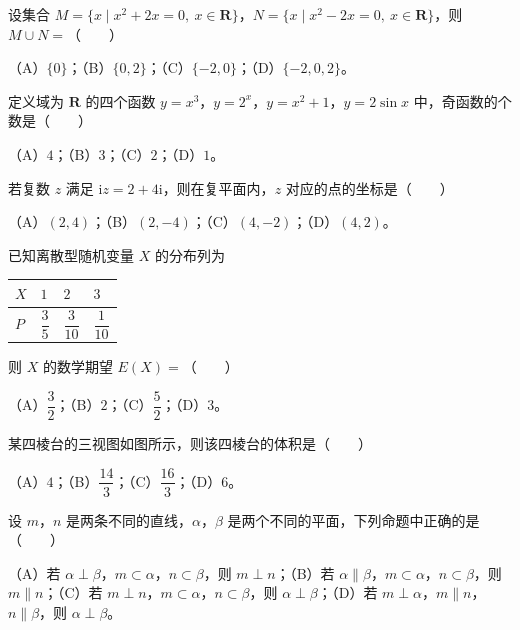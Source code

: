 \begin{question}
设集合 $M=\{x\mid x^2+2x=0,\ x\in\mathbf R\}$，$N=\{x\mid x^2-2x=0,\ x\in\mathbf R\}$，则 $M\cup N=$\mbox{（　　）}

（A）$\{0\}$；（B）$\{0,2\}$；（C）$\{-2,0\}$；（D）$\{-2,0,2\}$。

\end{question}
\begin{question}
定义域为 $\mathbf R$ 的四个函数 $y=x^3$，$y=2^x$，$y=x^2+1$，$y=2\sin x$ 中，奇函数的个数是\mbox{（　　）}

（A）$4$；（B）$3$；（C）$2$；（D）$1$。

\end{question}
\begin{question}
若复数 $z$ 满足 $\mathrm iz=2+4\mathrm i$，则在复平面内，$z$ 对应的点的坐标是\mbox{（　　）}

（A）$(2,4)$；（B）$(2,-4)$；（C）$(4,-2)$；（D）$(4,2)$。

\end{question}
\begin{question}
已知离散型随机变量 $X$ 的分布列为

\begin{center}
\begin{tabular}{llll}
\toprule
$X$ & $1$ & $2$ & $3$ \\
\midrule
$P$ & $\dfrac35$ & $\dfrac3{10}$ & $\dfrac1{10}$ \\
\bottomrule
\end{tabular}
\end{center}

则 $X$ 的数学期望 $E(X)=$\mbox{（　　）}

（A）$\dfrac32$；（B）$2$；（C）$\dfrac52$；（D）$3$。

\Needspace{0.4\textheight}
\end{question}
\begin{question}
某四棱台的三视图如图所示，则该四棱台的体积是\mbox{（　　）}
\nopagebreak[4]
\begin{center}\end{center}
\nopagebreak[4]
（A）$4$；（B）$\dfrac{14}{3}$；（C）$\dfrac{16}{3}$；（D）$6$。

\end{question}
\begin{question}
设 $m$，$n$ 是两条不同的直线，$\alpha$，$\beta$ 是两个不同的平面，下列命题中正确的是\mbox{（　　）}

（A）若 $\alpha\perp\beta$，$m\subset\alpha$，$n\subset\beta$，则 $m\perp n$；（B）若 $\alpha\parallel\beta$，$m\subset\alpha$，$n\subset\beta$，则 $m\parallel n$；（C）若 $m\perp n$，$m\subset\alpha$，$n\subset\beta$，则 $\alpha\perp\beta$；（D）若 $m\perp\alpha$，$m\parallel n$，$n\parallel\beta$，则 $\alpha\perp\beta$。

\end{question}
